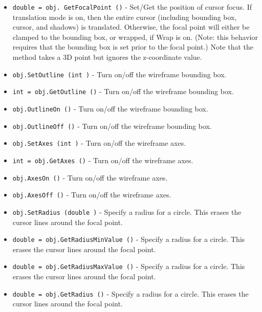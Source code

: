 \begin{itemize}
\item  \verb|double = obj. GetFocalPoint ()| -  Set/Get the position of cursor focus. If translation mode is on,
 then the entire cursor (including bounding box, cursor, and shadows)
 is translated. Otherwise, the focal point will either be clamped to the
 bounding box, or wrapped, if Wrap is on. (Note: this behavior requires
 that the bounding box is set prior to the focal point.) Note that the 
 method takes a 3D point but ignores the z-coordinate value.

\item  \verb|obj.SetOutline (int )| -  Turn on/off the wireframe bounding box.

\item  \verb|int = obj.GetOutline ()| -  Turn on/off the wireframe bounding box.

\item  \verb|obj.OutlineOn ()| -  Turn on/off the wireframe bounding box.

\item  \verb|obj.OutlineOff ()| -  Turn on/off the wireframe bounding box.

\item  \verb|obj.SetAxes (int )| -  Turn on/off the wireframe axes.

\item  \verb|int = obj.GetAxes ()| -  Turn on/off the wireframe axes.

\item  \verb|obj.AxesOn ()| -  Turn on/off the wireframe axes.

\item  \verb|obj.AxesOff ()| -  Turn on/off the wireframe axes.

\item  \verb|obj.SetRadius (double )| -  Specify a radius for a circle. This erases the cursor
 lines around the focal point.

\item  \verb|double = obj.GetRadiusMinValue ()| -  Specify a radius for a circle. This erases the cursor
 lines around the focal point.

\item  \verb|double = obj.GetRadiusMaxValue ()| -  Specify a radius for a circle. This erases the cursor
 lines around the focal point.

\item  \verb|double = obj.GetRadius ()| -  Specify a radius for a circle. This erases the cursor
 lines around the focal point.


\end{itemize}
